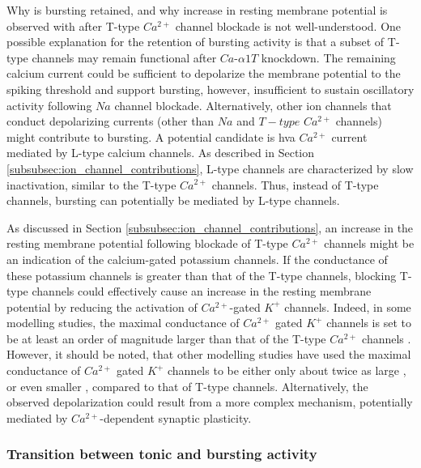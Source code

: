 \documentclass[../main.tex]{subfiles}
\begin{document}
Why is bursting retained, and why increase in resting membrane potential is observed with after T-type $Ca^{2+}$ channel blockade is not well-understood. One possible explanation for the retention of bursting activity is that a subset of T-type channels may remain functional after $Ca$-$\alpha1T$ knockdown. The remaining calcium current could be sufficient to depolarize the membrane potential to the spiking threshold and support bursting, however, insufficient to sustain oscillatory activity following $Na$ channel blockade. Alternatively, other ion channels that conduct depolarizing currents (other than $Na$ and $T-type$ $Ca^{2+}$ channels) might contribute to bursting. A potential candidate is \gls{hva} $Ca^{2+}$ current mediated by L-type calcium channels. As described in Section \ref{subsubsec:ion_channel_contributions}, L-type channels are characterized by slow inactivation, similar to the T-type $Ca^{2+}$ channels. Thus, instead of T-type channels, bursting can potentially be mediated by L-type channels.

As discussed in Section \ref{subsubsec:ion_channel_contributions}, an increase in the resting membrane potential following blockade of T-type $Ca^{2+}$ channels might be an indication of the calcium-gated potassium channels. If the conductance of these potassium channels is greater than that of the T-type channels, blocking T-type channels could
effectively cause an increase in the resting membrane potential by reducing the activation of $Ca^{2+}$-gated $K^+$ channels. Indeed, in some modelling studies, the maximal conductance of
$Ca^{2+}$ gated $K^+$ channels is set to be at least an order of magnitude larger than that of the
T-type $Ca^{2+}$ channels \cite{franciRobustTunableBursting2018,nowotnyProbingDynamicsIdentified2008}. However, it should be noted, that other modelling studies have used the maximal conductance of $Ca^{2+}$ gated $K^+$ channels to be either only about twice as large \cite{alonsoVisualizationCurrentsNeural2019}, or even smaller \cite{parkMathematicalModelSubthalamic2021}, compared to that of T-type channels.
Alternatively, the observed depolarization could result from a more complex mechanism, potentially mediated by $Ca^{2+}$-dependent synaptic plasticity.


\subsubsection{Transition between tonic and bursting activity} \label{subsubsec:transit_tonic_burst}
\end{document}
